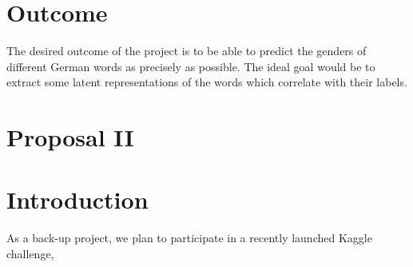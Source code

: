 \documentclass[10pt,twocolumn,letterpaper]{article}
\begin{document}
\section{Outcome}
    The desired outcome of the project is to be able to predict the genders of different German words as precisely as possible. The ideal goal would be to extract some latent representations of the words which correlate with their labels.

%
%
\section*{Proposal II}
\setcounter{section}{0}

\section{Introduction}
    As a back-up project, we plan to participate in a recently launched Kaggle challenge, 

{\small


}
\end{document}
